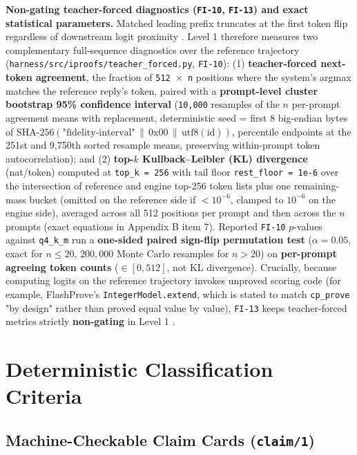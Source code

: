 \documentclass[11pt,letterpaper]{article}
\begin{document}
\textbf{Non-gating teacher-forced diagnostics (\texttt{FI-10}, \texttt{FI-13}) and exact statistical parameters.} Matched leading prefix truncates at the first token flip regardless of downstream logit proximity \cite{iproofs2026}. Level 1 therefore measures two complementary full-sequence diagnostics over the reference trajectory (\texttt{harness/\allowbreak{}src/\allowbreak{}iproofs/\allowbreak{}teacher\_\allowbreak{}forced.\allowbreak{}py}, \texttt{FI-10}): (1) \textbf{teacher-forced next-token agreement}, the fraction of \texttt{512 $\times$ n} positions where the system's argmax matches the reference reply's token, paired with a \textbf{prompt-level cluster bootstrap 95\% confidence interval} (\texttt{10,000} resamples of the $n$ per-prompt agreement means with replacement, deterministic seed = first 8 big-endian bytes of $\text{SHA-256}(\text{"fidelity-interval"} \,\|\,\allowbreak  \text{0x00} \,\|\,\allowbreak  \text{utf8}(\text{id}))$, percentile endpoints at the 251st and 9,750th sorted resample means, preserving within-prompt token autocorrelation); and (2) \textbf{top-$k$ Kullback--Leibler (KL) divergence} (nat/token) computed at \texttt{top\_\allowbreak{}k = 256} with tail floor \texttt{rest\_\allowbreak{}floor = 1e-6} over the intersection of reference and engine top-256 token lists plus one remaining-mass bucket (omitted on the reference side if $< 10^{-6}$, clamped to $10^{-6}$ on the engine side), averaged across all 512 positions per prompt and then across the $n$ prompts (exact equations in Appendix B item 7). Reported \texttt{FI-10} $p$-values against \texttt{q4\_\allowbreak{}k\_\allowbreak{}m} run a \textbf{one-sided paired sign-flip permutation test} ($\alpha = 0.05$, exact for $n \le 20$, $200{,}000$ Monte Carlo resamples for $n > 20$) on \textbf{per-prompt agreeing token counts} ($\in [0, 512]$, not KL divergence). Crucially, because computing logits on the reference trajectory invokes unproved scoring code (for example, FlashProve's \texttt{IntegerModel.\allowbreak{}extend}, which is stated to match \texttt{cp\_\allowbreak{}prove} "by design" rather than proved equal value by value), \texttt{FI-13} keeps teacher-forced metrics strictly \textbf{non-gating} in Level 1 \cite{iproofs2026}.

\section{Deterministic Classification Criteria}

\subsection{Machine-Checkable Claim Cards (\texttt{claim/\allowbreak{}1})}
\end{document}

